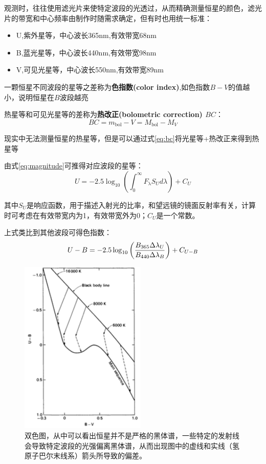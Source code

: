 观测时，往往使用滤光片来使特定波段的光透过，从而精确测量恒星的颜色，滤光片的带宽和中心频率由制作时随需求确定，但有时也用统一标准：
\begin{itemize}
  \item U,紫外星等，中心波长365\;nm,有效带宽68\;nm
  \item B,蓝光星等，中心波长440\;nm,有效带宽98\;nm
  \item V,可见光星等，中心波长550\;nm,有效带宽89\;nm
\end{itemize}

一颗恒星不同波段的星等之差称为{\bf 色指数(color index)},如色指数$B-V$的值越小，说明恒星在$B$波段越亮

热星等和可见光星等的差称为{\bf 热改正(bolometric correction) $BC$}：
\begin{equation}
  BC=m_\mathrm{bol}-V=M_\mathrm{bol}-M_V
  \label{eq:bc}
\end{equation}

现实中无法测量恒星的热星等，但是可以通过式\ref{eq:bc}将光星等+热改正来得到热星等

由式\ref{eq:magnitude}可推得对应波段的星等：
\begin{equation}
  U=-2.5\log_{10}\left(\int_0^\infty F_\mathrm\lambda S_U d\lambda\right)+C_U
\end{equation}

其中$S_U$是响应函数，用于描述入射光的比率，和望远镜的镜面反射率有关，计算时可考虑在有效带宽内为1，有效带宽外为0；$C_U$是一个常数。

上式类比到其他波段可得色指数：
\begin{equation}
  U-B=-2.5\log_{10}\left({B_{365}\Delta\lambda_U \over B_{440}\Delta\lambda_B}\right)+C_{U-B}
\end{equation}

\begin{figure}[hbt]
  \centering
  \includegraphics[width=6cm]{chapters/03/CC}
  \caption{双色图，从中可以看出恒星并不是严格的黑体谱，一些特定的发射线会导致特定波段的光强偏离黑体谱，从而出现图中的虚线和实线（氢原子巴尔末线系）箭头所导致的偏差。}
  \label{fig:cc}
\end{figure}
